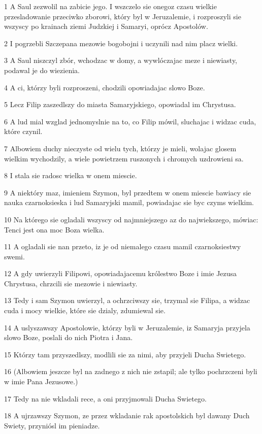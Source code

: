 \par 1 A Saul zezwolil na zabicie jego. I wszczelo sie onegoz czasu wielkie przesladowanie przeciwko zborowi, który byl w Jeruzalemie, i rozproszyli sie wszyscy po krainach ziemi Judzkiej i Samaryi, oprócz Apostolów.
\par 2 I pogrzebli Szczepana mezowie bogobojni i uczynili nad nim placz wielki.
\par 3 A Saul niszczyl zbór, wchodzac w domy, a wywlóczajac meze i niewiasty, podawal je do wiezienia.
\par 4 A ci, którzy byli rozproszeni, chodzili opowiadajac slowo Boze.
\par 5 Lecz Filip zaszedlszy do miasta Samaryjskiego, opowiadal im Chrystusa.
\par 6 A lud mial wzglad jednomyslnie na to, co Filip mówil, sluchajac i widzac cuda, które czynil.
\par 7 Albowiem duchy nieczyste od wielu tych, którzy je mieli, wolajac glosem wielkim wychodzily, a wiele powietrzem ruszonych i chromych uzdrowieni sa.
\par 8 I stala sie radosc wielka w onem miescie.
\par 9 A niektóry maz, imieniem Szymon, byl przedtem w onem miescie bawiacy sie nauka czarnoksieska i lud Samaryjski mamil, powiadajac sie byc czyms wielkim.
\par 10 Na którego sie ogladali wszyscy od najmniejszego az do najwiekszego, mówiac: Tenci jest ona moc Boza wielka.
\par 11 A ogladali sie nan przeto, iz je od niemalego czasu mamil czarnoksiestwy swemi.
\par 12 A gdy uwierzyli Filipowi, opowiadajacemu królestwo Boze i imie Jezusa Chrystusa, chrzcili sie mezowie i niewiasty.
\par 13 Tedy i sam Szymon uwierzyl, a ochrzciwszy sie, trzymal sie Filipa, a widzac cuda i mocy wielkie, które sie dzialy, zdumiewal sie.
\par 14 A uslyszawszy Apostolowie, którzy byli w Jeruzalemie, iz Samaryja przyjela slowo Boze, poslali do nich Piotra i Jana.
\par 15 Którzy tam przyszedlszy, modlili sie za nimi, aby przyjeli Ducha Swietego.
\par 16 (Albowiem jeszcze byl na zadnego z nich nie zstapil; ale tylko pochrzczeni byli w imie Pana Jezusowe.)
\par 17 Tedy na nie wkladali rece, a oni przyjmowali Ducha Swietego.
\par 18 A ujrzawszy Szymon, ze przez wkladanie rak apostolskich byl dawany Duch Swiety, przyniósl im pieniadze.
